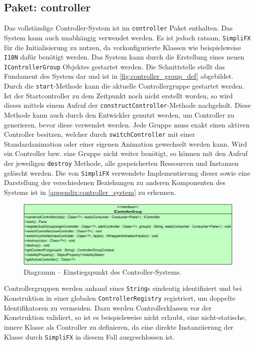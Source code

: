 \subsection{Paket: controller}
Das vollständige Controller-System ist im \texttt{controller} Paket enthalten. Das System kann auch unabhängig verwendet werden. Es ist jedoch ratsam, \texttt{SimpliFX} für die Initialisierung zu nutzen, da vorkonfigurierte Klassen wie beispielsweise \texttt{I18N} dafür benötigt werden. Das System kann durch die Erstellung eines neuen \texttt{IControllerGroup} Objektes gestartet werden. Die Schnittstelle stellt das Fundament des System dar und ist in \autoref{fig:controller_group_def} abgebildet. Durch die \texttt{start}-Methode kann die aktuelle Controllergruppe gestartet werden. Ist der Startcontroller zu dem Zeitpunkt noch nicht erstellt worden, so wird dieses mittels einem Aufruf der \texttt{constructController}-Methode nachgeholt. Diese Methode kann auch durch den Entwickler genutzt werden, um Controller zu generieren, bevor diese verwendet werden. Jede Gruppe muss exakt einen aktiven Controller besitzen, welcher durch \texttt{switchController} mit einer Standardanimation oder einer eigenen Animation gewechselt werden kann. Wird ein Controller bzw. eine Gruppe nicht weiter benötigt, so können mit den Aufruf der jeweiligen \texttt{destroy} Methode, alle gespeicherten Ressourcen und Instanzen gelöscht werden. Die von \texttt{SimpliFX} verwendete Implementierung dieser sowie eine Darstellung der verschiedenen Beziehungen zu anderen Komponenten des Systems ist in \autoref{appendix:controller_system} zu erkennen.
\begin{figure}[H]
	\centering
	\includegraphics[width=\textwidth]{Abbildungen/Controller-System-Group.png}
	\caption{Diagramm -- Einstiegspunkt des Controller-Systems.}
	\label{fig:controller_group_def}
\end{figure}
\noindent Controllergruppen werden anhand eines \texttt{String}s eindeutig identifiziert und bei Konstruktion in einer globalen \texttt{ControllerRegistry} registriert, um doppelte Identifikatoren zu vermeiden. Dazu werden Controllerklassen vor der Konstruktion validiert, so ist es beispielsweise nicht erlaubt, eine nicht-statische, innere Klasse als Controller zu definieren, da eine direkte Instanziierung der Klasse durch \texttt{SimpliFX} in diesem Fall ausgeschlossen ist.
